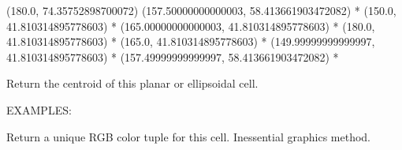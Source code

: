 \documentclass[a4paper,12ptopenany,oneside,english]{sphinxmanual}
\begin{document}
\begin{fulllineitems}
\begin{fulllineitems}
\begin{description}
\sphinxAtStartPar
(\sphinxhyphen{}180.0, 74.35752898700072)
(\sphinxhyphen{}157.50000000000003, 58.413661903472082) *
(\sphinxhyphen{}150.0, 41.810314895778603) *
(\sphinxhyphen{}165.00000000000003, 41.810314895778603) *
(\sphinxhyphen{}180.0, 41.810314895778603) *
(165.0, 41.810314895778603) *
(149.99999999999997, 41.810314895778603) *
(157.49999999999997, 58.413661903472082) *

\end{description}

\end{fulllineitems}


\begin{fulllineitems}
\label{\detokenize{dggs:rhealpixdggs.dggs.Cell.centroid}}
\pysigstartsignatures
{}
\pysigstopsignatures
\sphinxAtStartPar
Return the centroid of this planar or ellipsoidal cell.

\sphinxAtStartPar
EXAMPLES:

\begin{sphinxVerbatim}[commandchars=\\\{\}]
  
   \PYG{p}{[}  \PYG{p}{]}
  
  
  
\end{sphinxVerbatim}

\end{fulllineitems}


\begin{fulllineitems}
\label{\detokenize{dggs:rhealpixdggs.dggs.Cell.color}}
\pysigstartsignatures
{}
\pysigstopsignatures
\sphinxAtStartPar
Return a unique RGB color tuple for this cell.
Inessential graphics method.


\end{fulllineitems}
\end{fulllineitems}
\end{document}
